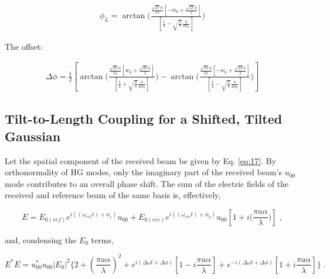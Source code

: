 \documentclass[aps,twoside,secnumarabic,balancelastpage,amsmath,amssymb,nofootinbib,hyperref=pdftex]{revtex4}
\newcommand{\bigfrac}[2]{\Big( \frac{#1}{#2}\Big)}
\begin{document}
\begin{align*}
	\phi_L = \arctan \bigfrac{			\frac{\sqrt{2 \pi} \alpha }{2 \lambda}
			\left[
				-w_0
				+
				\frac{\sqrt{2 \pi} a }{2}		
			\right]}{\left[
				\frac{1}{4}
				-
				\sqrt{\frac{2}{\pi}}\frac{a}{2 w_0}	
		\right]}
\end{align*}		

The offset:

\begin{align*}
	\Delta \phi =
	\frac{1}{2}	
	\left[
	\arctan \bigfrac{			\frac{\sqrt{2 \pi} \alpha }{2 \lambda}
			\left[
				w_0
				+
				\frac{\sqrt{2 \pi} a }{2}		
			\right]}{\left[
				\frac{1}{4}
				+
				\sqrt{\frac{2}{\pi}}\frac{a}{2 w_0}	
		\right]}
		-
	 \arctan \bigfrac{			\frac{\sqrt{2 \pi} \alpha }{2 \lambda}
			\left[
				-w_0
				+
				\frac{\sqrt{2 \pi} a }{2}		
			\right]}{\left[
				\frac{1}{4}
				-
				\sqrt{\frac{2}{\pi}}\frac{a}{2 w_0}	
		\right]}		
	\right]
\end{align*}
		
\subsection{Tilt-to-Length Coupling for a Shifted, Tilted Gaussian}

Let the spatial component of the received beam be given by Eq. \ref{eq:17}. By orthonormality of HG modes, only the imaginary part of the received beam's $u_{00}$ mode contributes to an overall phase shift. The sum of the electric fields of the received and reference beam of the same basis is, effectively,

\begin{equation}
	E = 
			E_{0(ref)} 
			e^{i(( \omega_{ref} t)+\phi_{1})} 
			u_{00}
			+
			E_{0(rec)}			
			e^{i (( \omega_{rec}t)+\phi_{2})}
			u_{00}
			\left[
				1+i \bigfrac{\pi a \alpha}{\lambda}
			\right]	 \; ,
\end{equation}

and, condensing the $E_{0}$ terms,

\begin{equation}
	E^{*}E = 
    u_{00}^*u_{00}
		|E_{0}|^2 
		\lbrace
        2
        +
        (\frac{\pi a \alpha }{\lambda})^2
        +
			e^{i  (\Delta \omega t + \Delta \phi) }
				\left[
					1 - i\frac{\pi a \alpha }{\lambda}
				\right]
			+
			e^{-i  (\Delta \omega t + \Delta \phi) }
				\left[
					1 + i\frac{\pi a \alpha }{\lambda}
				\right]
		\rbrace 
		\;.
\end{equation}
\end{document}
